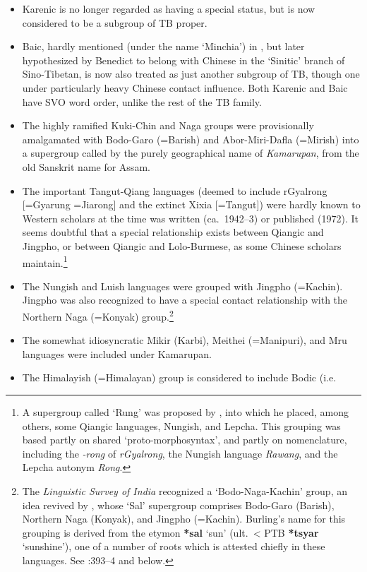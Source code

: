 \begin{itemize}
\item Karenic is no longer regarded as having a special status, but is now
considered to be a subgroup of TB proper.
\item Baic, hardly mentioned (under the name ‘Minchia’) in \textit{}, but later
hypothesized by Benedict to belong with Chinese in the ‘Sinitic’ branch of 
Sino-Tibetan, is now also treated as just another subgroup of TB, though one
under particularly heavy Chinese contact influence. Both Karenic and Baic have
SVO word order, unlike the rest of the TB family.
\item The highly ramified Kuki-Chin and Naga groups were provisionally
amalgamated with Bodo-Garo (=Barish) and Abor-Miri-Dafla (=Mirish) into a
supergroup called by the purely geographical name of \textit{Kamarupan}, from the old
Sanskrit name for Assam.
\item The important Tangut-Qiang languages (deemed to include rGyalrong
[=Gyarung =Jiarong] and the extinct Xixia [=Tangut]) were hardly known to Western
scholars at the time \textit{} was written (ca.~1942–3) or published (1972). It seems
doubtful that a special relationship exists between Qiangic and Jingpho, or
between Qiangic and Lolo-Burmese, as some Chinese scholars maintain.\footnote{A
supergroup called ‘Rung’ was proposed by \citet{GT-Rung}, into which he placed,
among others, some Qiangic languages, Nungish, and Lepcha. This grouping was
based partly on shared ‘proto-morphosyntax’, and partly on nomenclature,
including the \textit{-rong} of \textit{rGyalrong},
the Nungish language \textit{Rawang}, and the Lepcha autonym \textit{Rong}.}
\item The Nungish and Luish languages were grouped with Jingpho (=Kachin). Jingpho
was also recognized to have a special contact relationship with the Northern Naga
(=Konyak) group.\footnote{The \textit{Linguistic Survey of India}
\citep{LSI} recognized a ‘Bodo-Naga-Kachin’ group,
an idea revived by \citet{RB-Sal}, whose ‘Sal’ supergroup comprises Bodo-Garo (Barish), Northern Naga
(Konyak), and Jingpho (=Kachin). Burling’s name for this grouping is derived
from the etymon \textbf{*sal} ‘sun’ (ult.\ < PTB \textbf{*tsyar} ‘sunshine’), one of a number of
roots which is attested chiefly in these languages. See \textit{}:393–4 and below.}
\item The somewhat idiosyncratic Mikir (Karbi), Meithei (=Manipuri), and Mru languages were included under Kamarupan.
\item The Himalayish (=Himalayan) group is considered to include Bodic (i.e.\

\end{itemize}
